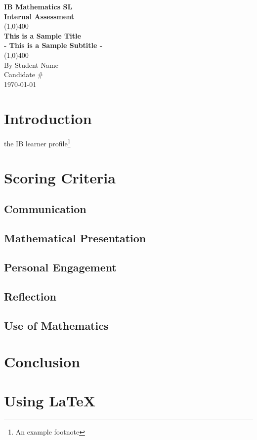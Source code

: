 \documentclass[11pt]{article}
\begin{document}
\begin{titlepage}
\begin{center}
\vspace*{1cm}
\Large{\textbf{IB Mathematics SL}}\\
\Large{\textbf{Internal Assessment}}\\
\vfill
\line(1,0){400}\\[1mm]
\huge{\textbf{This is a Sample Title}}\\[3mm]
\Large{\textbf{- This is a Sample Subtitle -}}\\[1mm]
\line(1,0){400}\\
\vfill
By Student Name\\
Candidate \# \\
\today \\
\end{center}
\end{titlepage}

\tableofcontents
\thispagestyle{empty}
\clearpage

\setcounter{page}{1}

\section{Introduction}
the IB learner profile\footnote{An example footnote}

\section{Scoring Criteria}

\subsection{Communication}

\subsection{Mathematical Presentation}

\subsection{Personal Engagement}

\subsection{Reflection}

\subsection{Use of Mathematics}

\section{Conclusion}

\section{Using \LaTeX\ }
\end{document}
